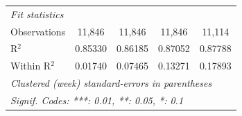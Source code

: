 \begin{tabular}{lcccc}
   \midrule
   \emph{Fit statistics}\\
   Observations       & 11,846         & 11,846           & 11,846              & 11,114\\  
   R$^2$              & 0.85330        & 0.86185          & 0.87052             & 0.87788\\  
   Within R$^2$       & 0.01740        & 0.07465          & 0.13271             & 0.17893\\  
   \midrule \midrule
   \multicolumn{5}{l}{\emph{Clustered (week) standard-errors in parentheses}}\\
   \multicolumn{5}{l}{\emph{Signif. Codes: ***: 0.01, **: 0.05, *: 0.1}}\\
\end{tabular}
\par\endgroup


